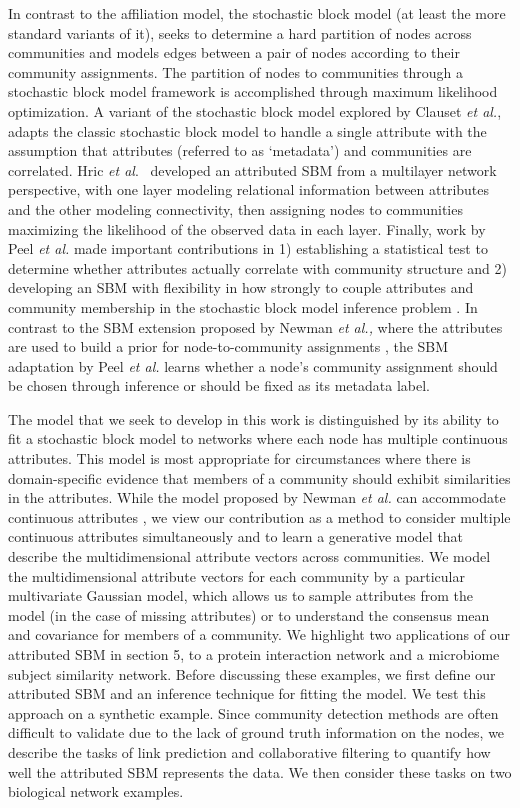 \documentclass[10pt,journal,compsoc]{IEEEtran}
\begin{document}
In contrast to the affiliation model, the stochastic block model \cite{sbmOrig} (at least the more standard variants of it), seeks to determine a hard partition of nodes across communities and models edges between a pair of nodes according to their community assignments. The partition of nodes to communities through a stochastic block model framework is accomplished through maximum likelihood optimization. A variant of the stochastic block model explored by Clauset \emph{et al.}, \cite{clauset} adapts the classic stochastic block model to handle a single attribute with the assumption that attributes (referred to as `metadata') and communities are correlated. Hric \emph{et al}.~\cite{hric} developed an attributed SBM from a multilayer network perspective, with one layer modeling relational information between attributes and the other modeling connectivity, then assigning nodes to communities maximizing the likelihood of the observed data in each layer. Finally, work by Peel \emph{et al.} made important contributions in 1) establishing a statistical test to determine whether attributes actually correlate with community structure and 2) developing an SBM with flexibility in how strongly to couple attributes and community membership in the stochastic block model inference problem \cite{peel2017ground}. In contrast to the SBM extension proposed by Newman \emph{et al.,}  where the attributes are used to build a prior for node-to-community assignments \cite{clauset}, the SBM adaptation by Peel \emph{et al.} learns whether a node's community assignment should be chosen through inference or should be fixed as its metadata label. 

The model that we seek to develop in this work is distinguished by its ability to fit a stochastic block model to networks where each node has multiple continuous attributes. This model is most appropriate for circumstances where there is domain-specific evidence that members of a community should exhibit similarities in the attributes. While the model proposed by Newman \emph{et al.} can accommodate continuous attributes \cite{clauset}, we view our contribution as a method to consider multiple continuous attributes simultaneously and to learn a generative model that describe the multidimensional attribute vectors across communities. We model the multidimensional attribute vectors for each community by a particular multivariate Gaussian model, which allows us to  sample attributes from the model (in the case of missing attributes) or to understand the consensus mean and covariance for members of a community.  We highlight two applications of our attributed SBM in section 5,  to a protein interaction network and a microbiome subject similarity network. Before discussing these examples, we first define our attributed SBM and an inference technique for fitting the model. We test this approach on a synthetic example. Since community detection methods are often difficult to validate due to the lack of ground truth information on the nodes, we describe the tasks of link prediction and collaborative filtering to quantify how well the attributed SBM represents the data. We then consider these tasks on two biological network examples.
\end{document}
